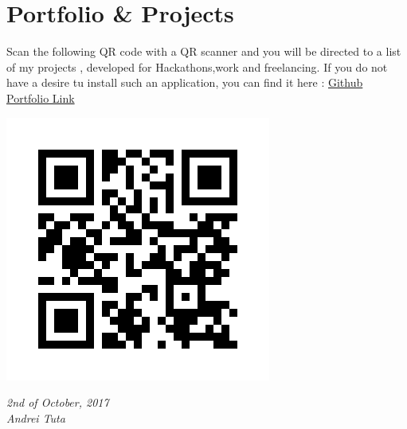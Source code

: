 \documentclass[]{friggeri-cv}
\begin{document}
\section{Portfolio \& Projects}
  \setlength{\parindent}{10ex}
    {Scan the following QR code with a QR scanner and you will be directed to a list of my projects , developed for Hackathons,work and freelancing.
    If you do not have a desire tu install such an application, you can find it here : \href{https://github.com/AndreiTuta/CV }{Github Portfolio Link} \n }\par
\includegraphics[scale=0.30]{img/static_qr_code_without_logo.jpg}
\n

\begin{flushleft}
\emph{2nd of October, 2017}
\\
\emph{Andrei Tuta}
\end{flushleft}
\end{document}
